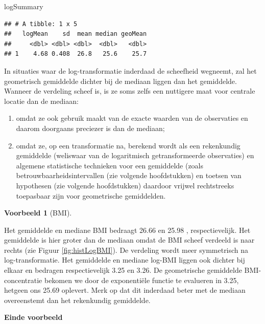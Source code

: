 \documentclass[
  12pt,dutch]{book}
\newenvironment{Shaded}{\begin{snugshade}}{\end{snugshade}}
\newcommand{\NormalTok}[1]{#1}
\theoremstyle{definition}
\theoremstyle{definition}
\newtheorem{example}{Voorbeeld}[chapter]
\theoremstyle{definition}
\theoremstyle{definition}
\theoremstyle{remark}
\begin{document}
\begin{Shaded}
\begin{Highlighting}[]
\NormalTok{logSummary}
\end{Highlighting}
\end{Shaded}

\begin{verbatim}
## # A tibble: 1 x 5
##   logMean    sd  mean median geoMean
##     <dbl> <dbl> <dbl>  <dbl>   <dbl>
## 1    4.68 0.408  26.8   25.6    25.7
\end{verbatim}

In situaties waar de log-transformatie inderdaad de scheefheid wegneemt, zal
het geometrisch gemiddelde dichter bij de mediaan liggen dan het gemiddelde.
Wanneer de verdeling scheef is, is ze soms zelfs een nuttigere maat voor centrale
locatie dan de mediaan:

\begin{enumerate}
\def\labelenumi{\arabic{enumi}.}
\item
  omdat ze ook gebruik maakt van de exacte waarden van de observaties en
  daarom doorgaans preciezer is dan de mediaan;
\item
  omdat ze, op een transformatie na, berekend wordt als een rekenkundig
  gemiddelde (weliswaar van de logaritmisch getransformeerde observaties) en
  algemene statistische technieken voor een gemiddelde (zoals
  betrouwbaarheidsintervallen (zie volgende hoofdstukken) en toetsen van hypothesen (zie volgende hoofdstukken) daardoor vrijwel rechtstreeks
  toepasbaar zijn voor geometrische gemiddelden.
\end{enumerate}

\begin{example}[BMI]
\protect\hypertarget{exm:unnamed-chunk-100}{}\label{exm:unnamed-chunk-100}~
\end{example}

Het gemiddelde en mediane BMI bedraagt 26.66 en 25.98 , respectievelijk. Het gemiddelde is hier groter dan de mediaan omdat de BMI scheef verdeeld is naar rechts (zie Figuur \ref{fig:histLogBMI}). De verdeling wordt meer symmetrisch na log-transformatie. Het gemiddelde en mediane log-BMI liggen ook dichter bij elkaar en bedragen respectievelijk 3.25 en 3.26. De geometrische gemiddelde BMI-concentratie bekomen we door de exponentiële functie te evalueren in 3.25, hetgeen ons 25.69 oplevert. Merk op dat dit inderdaad beter met de mediaan overeenstemt dan het rekenkundig gemiddelde.

\textbf{Einde voorbeeld}
\end{document}
